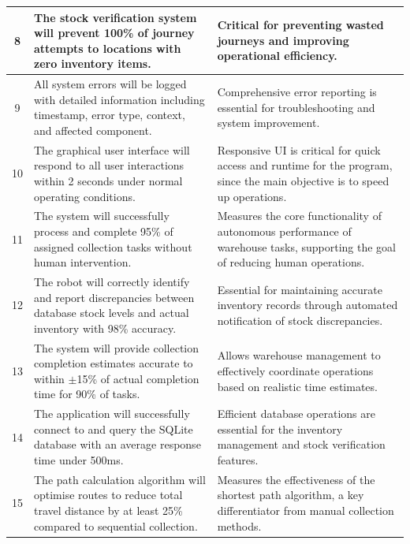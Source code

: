 \begin{table}[htbp!]
\begin{tabularx}{\textwidth}{|c|X|X|}
\hline
8 & The stock verification system will prevent 100\% of journey attempts to locations with zero inventory items. & Critical for preventing wasted journeys and improving operational efficiency. \\
\hline
9 & All system errors will be logged with detailed information including timestamp, error type, context, and affected component. & Comprehensive error reporting is essential for troubleshooting and system improvement. \\
\hline
10 & The graphical user interface will respond to all user interactions within 2 seconds under normal operating conditions. & Responsive UI is critical for quick access and runtime for the program, since the main objective is to speed up operations. \\
\hline
11 & The system will successfully process and complete 95\% of assigned collection tasks without human intervention. & Measures the core functionality of autonomous performance of warehouse tasks, supporting the goal of reducing human operations. \\
\hline
12 & The robot will correctly identify and report discrepancies between database stock levels and actual inventory with 98\% accuracy. & Essential for maintaining accurate inventory records through automated notification of stock discrepancies. \\
\hline
13 & The system will provide collection completion estimates accurate to within $\pm$15\% of actual completion time for 90\% of tasks. & Allows warehouse management to effectively coordinate operations based on realistic time estimates. \\
\hline
14 & The application will successfully connect to and query the SQLite database with an average response time under 500ms. & Efficient database operations are essential for the inventory management and stock verification features. \\
\hline
15 & The path calculation algorithm will optimise routes to reduce total travel distance by at least 25\% compared to sequential collection. & Measures the effectiveness of the shortest path algorithm, a key differentiator from manual collection methods. \\
\hline
\end{tabularx}
\end{table}
\newpage

